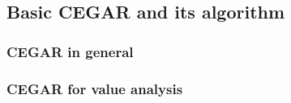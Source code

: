 \subsection{Basic CEGAR and its algorithm}
\subsubsection{CEGAR in general}
\subsubsection{CEGAR for value analysis}
